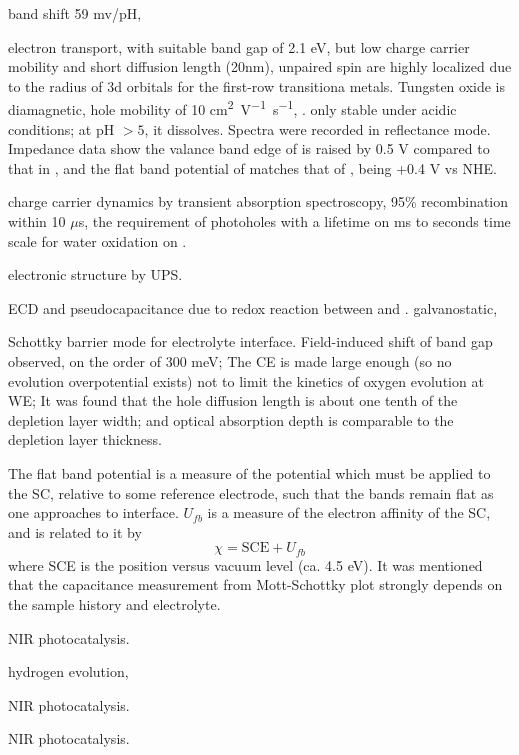 band shift 59 mv/pH, 

electron transport,  with suitable band gap of 2.1 eV, but low charge carrier mobility and short diffusion length (20nm), unpaired spin are highly localized due to the radius of 3d orbitals for the first-row transitiona metals.\cite{Yourey2011} Tungsten oxide is diamagnetic, hole mobility of 10 \si{cm^2V^{-1}s^{-1}}, \cite{Butler1977}.  only stable under acidic conditions; at pH $>5$, it dissolves. Spectra were recorded in reflectance mode. Impedance data show the valance band edge of  is raised by 0.5 V compared to that in , and the flat band potential of  matches that of , being +0.4 V vs NHE. 


 charge carrier dynamics by transient absorption spectroscopy, 95\% recombination within 10 $\mu$s, the requirement of photoholes with a lifetime on ms to seconds time scale for water oxidation on .   \cite{Pesci2011}

 electronic structure by UPS. \cite{Hochst1982}

 ECD and pseudocapacitance due to redox reaction between  and .\cite{Yang2014} galvanostatic, 

Schottky barrier mode for  electrolyte interface.\cite{Butler1977} Field-induced shift of band gap observed, on the order of 300 meV; The CE is made large enough (so no  evolution overpotential exists) not to limit the kinetics of oxygen evolution at WE; It was found that the hole diffusion length is about one tenth of the depletion layer width; and optical absorption depth is comparable to the depletion layer thickness. 

The flat band potential is a measure of the potential which must be applied to the SC, relative to some reference electrode, such that the bands remain flat as one approaches to interface. $U_{fb}$ is a measure of the electron affinity of the SC, and is related to it by 
\[
\chi = \text{SCE} + U_{fb}
\]
where SCE is the position versus vacuum level (ca. 4.5 eV). It was mentioned that the capacitance measurement from Mott-Schottky plot strongly depends on the sample history and electrolyte. 

 NIR photocatalysis.\cite{Sang2014}


 hydrogen evolution,\cite{Voiry2013a}

NIR photocatalysis.\cite{Li2014j}

NIR photocatalysis.\cite{Pak2012}

